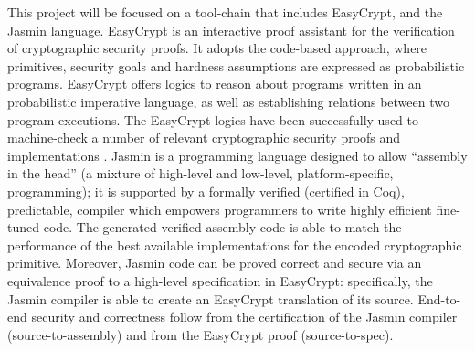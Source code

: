 \documentclass[preprint]{iacrtrans}
\begin{document}
  This project will be focused on a tool-chain that includes EasyCrypt,
  and the Jasmin language. EasyCrypt is an interactive proof assistant
  for the verification of cryptographic security proofs. It adopts the
  code-based approach, where primitives, security goals and hardness
  assumptions are expressed as probabilistic programs. EasyCrypt offers
  logics to reason about programs written in an probabilistic imperative
  language, as well as establishing relations between two program
  executions. The EasyCrypt logics have been successfully used to
  machine-check a number of relevant cryptographic security proofs and
  implementations \cite{SHA3,EUC,MASK,DIFP}. Jasmin \cite{JASM} is a programming
  language designed to allow “assembly in the head” (a mixture of
  high-level and low-level, platform-specific, programming); it is
  supported by a formally verified (certified in Coq), predictable,
  compiler which empowers programmers to write highly efficient
  fine-tuned code. The generated verified assembly code is able to match
  the performance of the best available implementations for the encoded
  cryptographic primitive. Moreover, Jasmin code can be proved correct
  and secure via an equivalence proof to a high-level specification in
  EasyCrypt: specifically, the Jasmin compiler is able to create an
  EasyCrypt translation of its source. End-to-end security and
  correctness follow from the certification of the Jasmin compiler
  (source-to-assembly) and from the EasyCrypt proof (source-to-spec).
\end{document}
